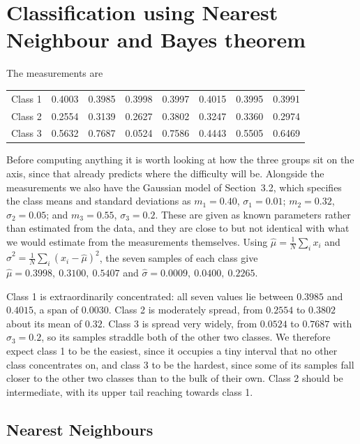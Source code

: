\documentclass[11pt]{article}
\begin{document}
\section{Classification using Nearest Neighbour and Bayes theorem}

The measurements are

\begin{table}[H]
    \centering
    \begin{tabular}{lccccccc}
        \toprule
        Class 1 & 0.4003 & 0.3985 & 0.3998 & 0.3997 & 0.4015 & 0.3995 & 0.3991 \\
        Class 2 & 0.2554 & 0.3139 & 0.2627 & 0.3802 & 0.3247 & 0.3360 & 0.2974 \\
        Class 3 & 0.5632 & 0.7687 & 0.0524 & 0.7586 & 0.4443 & 0.5505 & 0.6469 \\
        \bottomrule
    \end{tabular}
\end{table}

Before computing anything it is worth looking at how the three groups sit on
the axis, since that already predicts where the difficulty will be. Alongside
the measurements we also have the Gaussian model of Section~3.2, which
specifies the class means and standard deviations as $m_1 = 0.40$,
$\sigma_1 = 0.01$; $m_2 = 0.32$, $\sigma_2 = 0.05$; and $m_3 = 0.55$,
$\sigma_3 = 0.2$. These are given as known parameters rather than estimated
from the data, and they are close to but not identical with what we would
estimate from the measurements themselves. Using
$\hat{\mu} = \frac{1}{N}\sum_i x_i$ and
$\hat{\sigma}^2 = \frac{1}{N}\sum_i (x_i - \hat{\mu})^2$, the seven samples of
each class give $\hat{\mu} = 0.3998,\ 0.3100,\ 0.5407$ and
$\hat{\sigma} = 0.0009,\ 0.0400,\ 0.2265$.

Class 1 is extraordinarily concentrated: all seven values lie between $0.3985$
and $0.4015$, a span of $0.0030$. Class 2 is moderately spread, from $0.2554$
to $0.3802$ about its mean of $0.32$. Class 3 is spread very widely, from
$0.0524$ to $0.7687$ with $\sigma_3 = 0.2$, so its samples straddle both of
the other two classes. We therefore expect class 1 to
be the easiest, since it occupies a tiny interval that no other class
concentrates on, and class 3 to be the hardest, since some of its samples fall
closer to the other two classes than to the bulk of their own. Class 2 should
be intermediate, with its upper tail reaching towards class 1.

\subsection{Nearest Neighbours}
\end{document}
